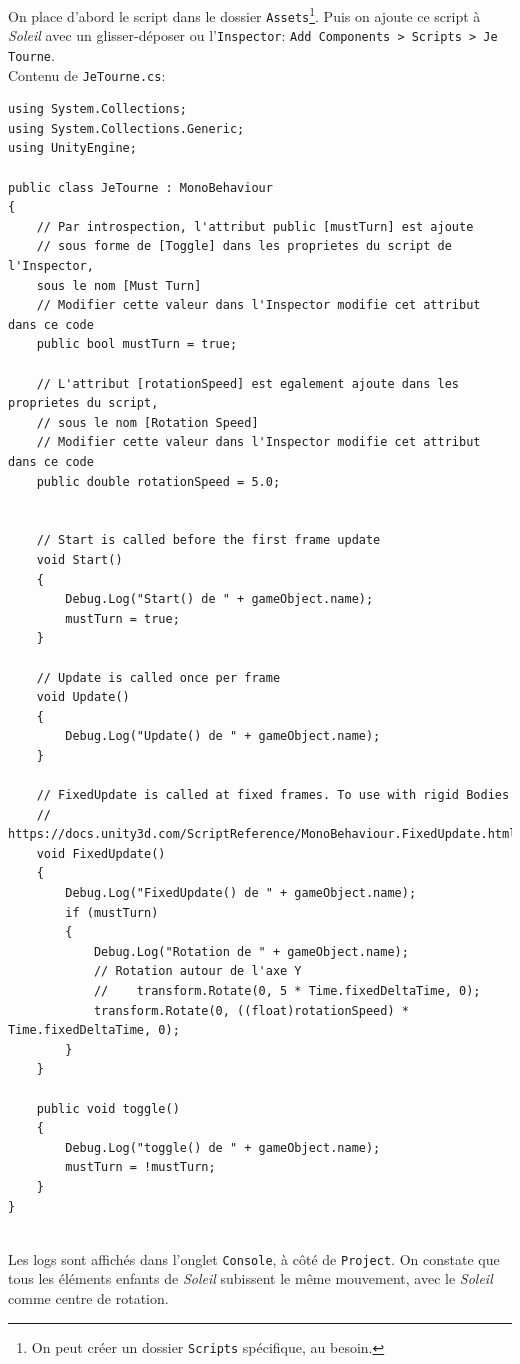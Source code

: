 \documentclass[a4paper,10pt]{article}
\newenvironment{solution}%
{\begin{tcolorbox}[breakable,colback=red!5!white,colframe=red!75!black,title=Solution]}%
{\end{tcolorbox}}
\begin{document}
\ifversionenseignant
\begin{solution}
	On place d'abord le script dans le dossier \texttt{Assets}\footnote{On peut créer un dossier \texttt{Scripts} spécifique, au besoin.}. Puis on ajoute ce script à \textit{Soleil} avec un glisser-déposer ou l'\texttt{Inspector}: \texttt{Add Components > Scripts > Je Tourne}. \\
	
Contenu de \lstinline|JeTourne.cs|:

\begin{lstlisting}
using System.Collections;
using System.Collections.Generic;
using UnityEngine;

public class JeTourne : MonoBehaviour
{
	// Par introspection, l'attribut public [mustTurn] est ajoute 
	// sous forme de [Toggle] dans les proprietes du script de l'Inspector, 
	sous le nom [Must Turn]
	// Modifier cette valeur dans l'Inspector modifie cet attribut dans ce code
	public bool mustTurn = true;
	
	// L'attribut [rotationSpeed] est egalement ajoute dans les proprietes du script,
	// sous le nom [Rotation Speed]
	// Modifier cette valeur dans l'Inspector modifie cet attribut dans ce code
	public double rotationSpeed = 5.0;
		
	
	// Start is called before the first frame update
	void Start()
	{
		Debug.Log("Start() de " + gameObject.name);
		mustTurn = true;
	}
	
	// Update is called once per frame
	void Update()
	{
		Debug.Log("Update() de " + gameObject.name);
	}
	
	// FixedUpdate is called at fixed frames. To use with rigid Bodies
	// https://docs.unity3d.com/ScriptReference/MonoBehaviour.FixedUpdate.html
	void FixedUpdate()
	{
		Debug.Log("FixedUpdate() de " + gameObject.name);
		if (mustTurn)
		{
		    Debug.Log("Rotation de " + gameObject.name);
			// Rotation autour de l'axe Y
			//    transform.Rotate(0, 5 * Time.fixedDeltaTime, 0);
			transform.Rotate(0, ((float)rotationSpeed) * Time.fixedDeltaTime, 0);
		}
	}
	
	public void toggle()
	{
		Debug.Log("toggle() de " + gameObject.name);
		mustTurn = !mustTurn;
	}
}
	
\end{lstlisting}

Les logs sont affichés dans l'onglet \texttt{Console}, à côté de \texttt{Project}. On constate que tous les éléments enfants de \textit{Soleil} subissent le même mouvement, avec le \textit{Soleil} comme centre de rotation.
\end{solution}
\fi 
\end{document}
